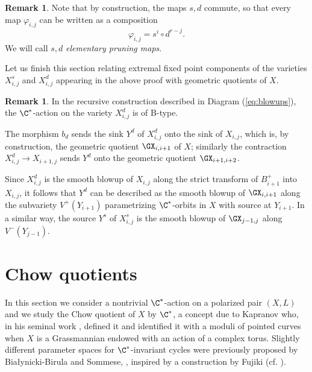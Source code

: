 \documentclass[reqno]{amsproc}
\theoremstyle{definition}
\newtheorem{remark}[theorem]{Remark}
\def\prul{s}
\def\prur{d}
\begin{document}
\begin{remark}\label{rem:WORS3}
Note that by construction, the maps $\prul,\prur$ commute, so that every map $\varphi_{i,j}$ can be written as a composition $$\varphi_{i,j}=\prul^{i}\circ\prur^{r-j}.$$
We will call $\prul,\prur$ {\em elementary pruning maps}.
\end{remark}

Let us finish this section relating  extremal fixed point components of the varieties $X^s_{i,j}$ and $X^d_{i,j}$  
appearing in the above proof with geometric quotients of $X$.

\begin{remark}\label{rem:GITblowup}
In the recursive construction described in Diagram (\ref{eq:blowups}), the $\C^*$-action on the variety $X^\prur_{i,j}$ is of B-type.  

The morphism $b_\prur$ sends the sink $Y^\prur$ of $X^\prur_{i,j}$  onto the sink of $X_{i,j}$, which is, by construction, the geometric quotient $\GX_{i,i+1}$ of $X$; similarly  the contraction $X^\prur_{i,j}\to X_{i+1,j}$ sends $Y^\prur$ onto the geometric quotient $\GX_{i+1,i+2}$. 

Since $X^\prur_{i,j}$ is the smooth blowup of $X_{i,j}$ along the strict transform of $B^+_{i+1}$ into $X_{i,j}$, it follows that $Y^\prur$ can be described as the smooth blowup of $\GX_{i,i+1}$ along the subvariety $V^+(Y_{i+1})$ parametrizing $\C^*$-orbits in $X$ with %
source at $Y_{i+1}$. In a similar way, the source $Y^\prul$ of $X^\prul_{i,j}$ is the smooth blowup of $\GX_{j-1,j}$ along $V^-(Y_{j-1})$.  
\end{remark}


\section{Chow quotients}\label{sec:Chow}

In this section we consider a nontrivial $\C^*$-action on a polarized pair $(X,L)$ and we  study the Chow quotient of $X$ by $\C^*$, a concept due to Kapranov who, in his seminal work \cite{Kap}, defined it and identified it with a moduli of pointed curves when $X$ is a Grassmannian endowed with an action of a complex torus. Slightly different parameter spaces for $\C^*$-invariant cycles were previously proposed  by Bia{\l}ynicki-Birula and Sommese, \cite{BBSo}, inspired by a construction by Fujiki (cf. \cite{Fj}).
\end{document}
